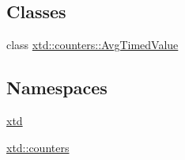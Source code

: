 \subsection*{Classes}
\begin{DoxyCompactItemize}
\item 
class \hyperlink{classxtd_1_1counters_1_1AvgTimedValue}{xtd\-::counters\-::\-Avg\-Timed\-Value}
\end{DoxyCompactItemize}
\subsection*{Namespaces}
\begin{DoxyCompactItemize}
\item 
\hyperlink{namespacextd}{xtd}
\item 
\hyperlink{namespacextd_1_1counters}{xtd\-::counters}
\end{DoxyCompactItemize}
